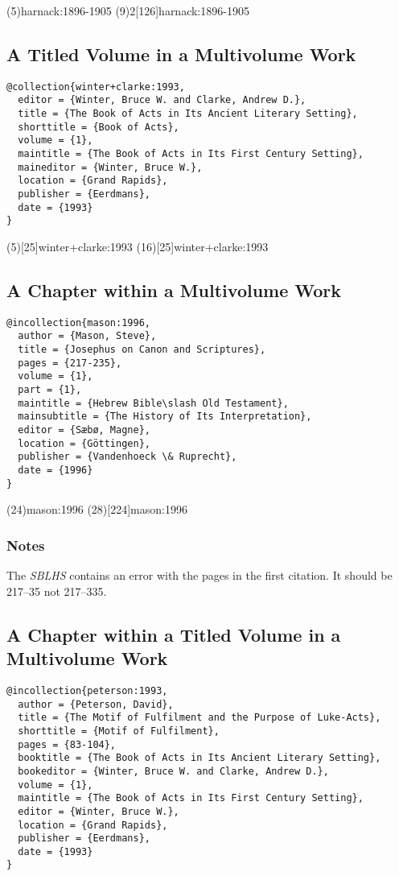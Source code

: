 \documentclass[a4paper]{article}
\begin{document}
\examplecite(5){harnack:1896-1905}
\examplevolcite(9){2}[126]{harnack:1896-1905}
\examplebibliography

\subsection{A Titled Volume in a Multivolume Work}

\begin{verbatim}
@collection{winter+clarke:1993,
  editor = {Winter, Bruce W. and Clarke, Andrew D.},
  title = {The Book of Acts in Its Ancient Literary Setting},
  shorttitle = {Book of Acts},
  volume = {1},
  maintitle = {The Book of Acts in Its First Century Setting},
  maineditor = {Winter, Bruce W.},
  location = {Grand Rapids},
  publisher = {Eerdmans},
  date = {1993}
}
\end{verbatim}

\examplecite(5)[25]{winter+clarke:1993}
\examplecite(16)[25]{winter+clarke:1993}
\examplebibliography

\subsection{A Chapter within a Multivolume Work}

\begin{verbatim}
@incollection{mason:1996,
  author = {Mason, Steve},
  title = {Josephus on Canon and Scriptures},
  pages = {217-235},
  volume = {1},
  part = {1},
  maintitle = {Hebrew Bible\slash Old Testament},
  mainsubtitle = {The History of Its Interpretation},
  editor = {Sæbø, Magne},
  location = {Göttingen},
  publisher = {Vandenhoeck \& Ruprecht},
  date = {1996}
}
\end{verbatim}

\examplecite(24){mason:1996}
\examplecite(28)[224]{mason:1996}
\examplebibliography

\subsubsection{Notes}

The \emph{SBLHS} contains an error with the pages in the first citation. It
should be 217–35 not 217–335.

\subsection{A Chapter within a Titled Volume in a Multivolume Work}

\begin{verbatim}
@incollection{peterson:1993,
  author = {Peterson, David},
  title = {The Motif of Fulfilment and the Purpose of Luke-Acts},
  shorttitle = {Motif of Fulfilment},
  pages = {83-104},
  booktitle = {The Book of Acts in Its Ancient Literary Setting},
  bookeditor = {Winter, Bruce W. and Clarke, Andrew D.},
  volume = {1},
  maintitle = {The Book of Acts in Its First Century Setting},
  editor = {Winter, Bruce W.},
  location = {Grand Rapids},
  publisher = {Eerdmans},
  date = {1993}
}
\end{verbatim}
\end{document}
